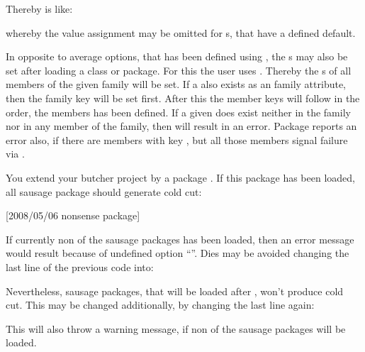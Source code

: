 \begin{Declaration}
\end{Declaration}
%
Thereby  is like:
whereby the value assignment may be omitted for s, that have a
defined default.

In opposite to average options, that has been defined using
, the s may also be set after loading a class
or package. For this the user uses . Thereby the
s of all members of the given family will be set. If a 
also exists as an family attribute, then the family key will be set
first. After this the member keys will follow in the order, the members has
been defined. If a given  does exist neither in the family nor in
any member of the family, then  will result in an
error. Package  reports an error also, if there are members
with key , but all those members signal failure via
.
\begin{Example}
  You extend your butcher project by a package . If this
  package has been loaded, all sausage package should generate cold cut:
\begin{lstcode}
                  [2008/05/06 nonsense package]
  \relax
\end{lstcode}
  If currently non of the sausage packages has been loaded, then an error
  message would result because of undefined option ``''. Dies
  may be avoided changing the last line of the previous code into:
\begin{lstcode}[moretexcs={Family@Options}]
\end{lstcode}
  Nevertheless, sausage packages, that will be loaded after
  , won't produce cold cut. This may be changed
  additionally, by changing the last line again:
\begin{lstcode}[moretexcs={Family@Options}]
\end{lstcode}
  This will also throw a warning message, if non of the sausage packages will
  be loaded.
\end{Example}
%
%


